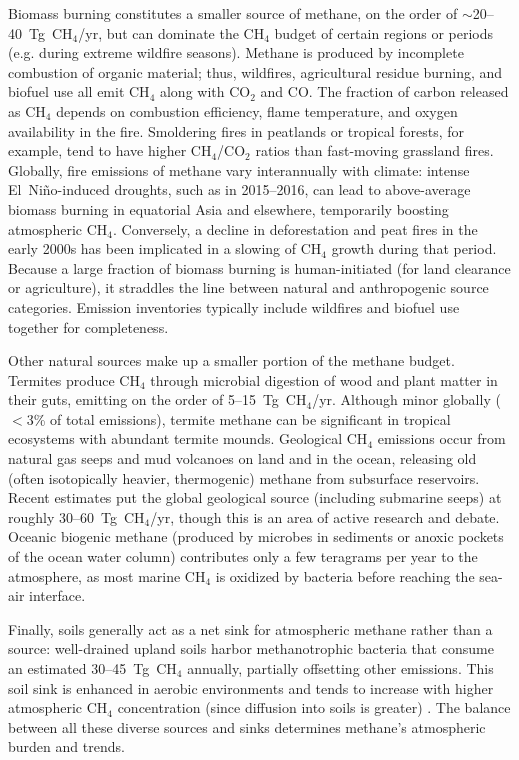 Biomass burning constitutes a smaller source of methane, on the order of $\sim$20--40~Tg~CH$_4$/yr, but can dominate the CH$_4$ budget of certain regions or periods (e.g. during extreme wildfire seasons). Methane is produced by incomplete combustion of organic material; thus, wildfires, agricultural residue burning, and biofuel use all emit CH$_4$ along with CO$_2$ and CO. The fraction of carbon released as CH$_4$ depends on combustion efficiency, flame temperature, and oxygen availability in the fire. Smoldering fires in peatlands or tropical forests, for example, tend to have higher CH$_4$/CO$_2$ ratios than fast-moving grassland fires. Globally, fire emissions of methane vary interannually with climate: intense El~Niño-induced droughts, such as in 2015--2016, can lead to above-average biomass burning in equatorial Asia and elsewhere, temporarily boosting atmospheric CH$_4$. Conversely, a decline in deforestation and peat fires in the early 2000s has been implicated in a slowing of CH$_4$ growth during that period. Because a large fraction of biomass burning is human-initiated (for land clearance or agriculture), it straddles the line between natural and anthropogenic source categories. Emission inventories typically include wildfires and biofuel use together for completeness.

Other natural sources make up a smaller portion of the methane budget. Termites produce CH$_4$ through microbial digestion of wood and plant matter in their guts, emitting on the order of 5--15~Tg~CH$_4$/yr. Although minor globally ($<$3\% of total emissions), termite methane can be significant in tropical ecosystems with abundant termite mounds. Geological CH$_4$ emissions occur from natural gas seeps and mud volcanoes on land and in the ocean, releasing old (often isotopically heavier, thermogenic) methane from subsurface reservoirs. Recent estimates put the global geological source (including submarine seeps) at roughly 30--60~Tg~CH$_4$/yr, though this is an area of active research and debate. Oceanic biogenic methane (produced by microbes in sediments or anoxic pockets of the ocean water column) contributes only a few teragrams per year to the atmosphere, as most marine CH$_4$ is oxidized by bacteria before reaching the sea-air interface.

Finally, soils generally act as a net sink for atmospheric methane rather than a source: well-drained upland soils harbor methanotrophic bacteria that consume an estimated 30--45~Tg~CH$_4$ annually, partially offsetting other emissions. This soil sink is enhanced in aerobic environments and tends to increase with higher atmospheric CH$_4$ concentration (since diffusion into soils is greater) \cite{global_methane_budget}. The balance between all these diverse sources and sinks determines methane's atmospheric burden and trends.

